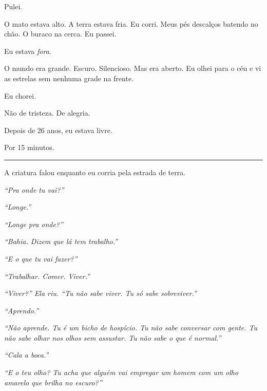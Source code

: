 \noindent Pulei.

\noindent O mato estava alto. A terra estava fria. Eu corri. Meus pés descalços batendo no chão. O buraco na cerca. Eu passei.

\noindent Eu estava \textit{fora}.

\noindent O mundo era grande. Escuro. Silencioso. Mas era aberto. Eu olhei para o céu e vi as estrelas sem nenhuma grade na frente.

\noindent Eu chorei.

\noindent Não de tristeza.
De alegria.

\noindent Depois de 26 anos, eu estava livre.

\noindent Por 15 minutos.

\vspace{0.5em}\noindent\rule{\textwidth}{0.5pt}\vspace{0.5em}

\noindent A criatura falou enquanto eu corria pela estrada de terra.

\noindent \textit{\textquotedblleft{}Pra onde tu vai?\textquotedblright{}}

\noindent \textit{\textquotedblleft{}Longe.\textquotedblright{}}

\noindent \textit{\textquotedblleft{}Longe pra onde?\textquotedblright{}}

\noindent \textit{\textquotedblleft{}Bahia. Dizem que lá tem trabalho.\textquotedblright{}}

\noindent \textit{\textquotedblleft{}E o que tu vai fazer?\textquotedblright{}}

\noindent \textit{\textquotedblleft{}Trabalhar. Comer. Viver.\textquotedblright{}}

\noindent \textit{\textquotedblleft{}Viver?\textquotedblright{}\textit{ Ela riu. }\textquotedblleft{}Tu não sabe viver. Tu só sabe sobreviver.\textquotedblright{}}

\noindent \textit{\textquotedblleft{}Aprendo.\textquotedblright{}}

\noindent \textit{\textquotedblleft{}Não aprende. Tu é um bicho de hospício. Tu não sabe conversar com gente. Tu não sabe olhar nos olhos sem assustar. Tu não sabe o que é normal.\textquotedblright{}}

\noindent \textit{\textquotedblleft{}Cala a boca.\textquotedblright{}}

\noindent \textit{\textquotedblleft{}E o teu olho? Tu acha que alguém vai empregar um homem com um olho amarelo que brilha no escuro?\textquotedblright{}}

